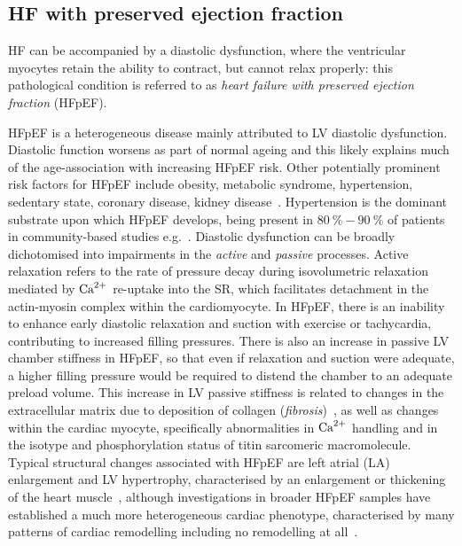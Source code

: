 %
%
%
\subsection{HF with preserved ejection fraction}
HF can be accompanied by a diastolic dysfunction, where the ventricular myocytes retain the ability to contract, but cannot relax properly: this pathological condition is referred to as \textit{heart failure with preserved ejection fraction} (\acs{HFpEF}).

\vspace{0.2cm}
HFpEF is a heterogeneous disease mainly attributed to LV diastolic dysfunction. Diastolic function worsens as part of normal ageing \cite{Andersen:2014} and this likely explains much of the age-association with increasing HFpEF risk. Other potentially prominent risk factors for HFpEF include obesity, metabolic syndrome, hypertension, sedentary state, coronary disease, kidney disease~\cite{Pfeffer:2019}. Hypertension is the dominant substrate upon which HFpEF develops, being present in $\SI{80}{\percent}-\SI{90}{\percent}$ of patients in community-based studies e.g.~\cite{Borlaug:2009}. Diastolic dysfunction can be broadly dichotomised into impairments in the \textit{active} and \textit{passive} processes. Active relaxation refers to the rate of pressure decay during isovolumetric relaxation mediated by $\textrm{Ca}^{2+}$ re-uptake into the SR, which facilitates detachment in the actin-myosin complex within the cardiomyocyte. In HFpEF, there is an inability to enhance early diastolic relaxation and suction with exercise or tachycardia, contributing to increased filling pressures. There is also an increase in passive LV chamber stiffness in HFpEF, so that even if relaxation and suction were adequate, a higher filling pressure would be required to distend the chamber to an adequate preload volume. This increase in LV passive stiffness is related to changes in the extracellular matrix due to deposition of collagen (\textit{fibrosis})~\cite{Burlew:2002}, as well as changes within the cardiac myocyte, specifically abnormalities in $\textrm{Ca}^{2+}$ handling and in the isotype and phosphorylation status of titin sarcomeric macromolecule. Typical structural changes associated with HFpEF are left atrial (LA) enlargement and LV hypertrophy, characterised by an enlargement or thickening of the heart muscle~\cite{Zile:2004}, although investigations in broader HFpEF samples have established a much more heterogeneous cardiac phenotype, characterised by many patterns of cardiac remodelling including no remodelling at all~\cite{Shah:2012}.



